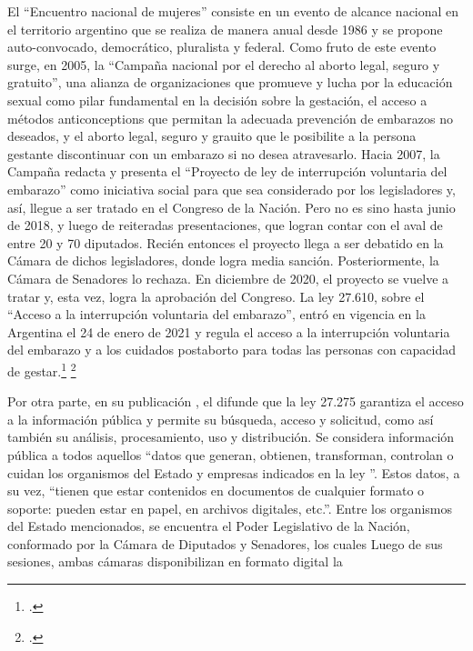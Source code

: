 El ``Encuentro nacional de mujeres'' consiste en un evento de alcance nacional
en el territorio argentino que se realiza de manera anual desde 1986 y se propone
auto-convocado, democr\'atico, pluralista y federal.
Como fruto de este evento surge, en 2005, la ``Campaña nacional por el derecho al
aborto legal, seguro y gratuito'', una alianza de organizaciones que promueve y
lucha por la educaci\'on sexual como pilar fundamental en la decisi\'on sobre la gestaci\'on,
el acceso a m\'etodos anticonceptions que permitan la adecuada prevenci\'on de embarazos
no deseados, y el aborto legal, seguro y grauito que le posibilite a la persona gestante
discontinuar con un embarazo si no desea atravesarlo.
Hacia 2007, la Campaña redacta y presenta el ``Proyecto de ley de interrupci\'on
voluntaria del embarazo'' como iniciativa social para que sea considerado por los
legisladores y, as\'i, llegue a ser tratado en el Congreso de la Naci\'on.
Pero no es sino hasta junio de 2018, y luego de reiteradas presentaciones, que logran
contar con el aval de entre 20 y 70 diputados. Reci\'en entonces el proyecto llega a
ser debatido en la C\'amara de dichos legisladores, donde logra media sanci\'on.
Posteriormente, la C\'amara de Senadores lo rechaza.
En diciembre de 2020, el proyecto se vuelve a tratar y, esta vez, logra la aprobaci\'on
del Congreso.
La ley 27.610, sobre el ``Acceso a la interrupci\'on voluntaria del embarazo'', entr\'o
en vigencia en la Argentina el 24 de enero de 2021 y regula el acceso a la
interrupci\'on voluntaria del embarazo y a los cuidados postaborto para todas
las personas con capacidad de gestar.\footnote{\citeauthor{campana@lalucha}.}
\footnote{\citeauthor{huesped@historia}.}
\par
Por otra parte, en su publicaci\'on ,
el \citeauthor{minjusticia@accesoinfo} difunde que la ley 27.275 garantiza el acceso a la
informaci\'on p\'ublica y permite su b\'usqueda,
acceso y solicitud, como as\'i tambi\'en su an\'alisis, procesamiento, uso y
distribuci\'on.
Se considera informaci\'on p\'ublica a todos aquellos ``datos que generan, obtienen,
transforman, controlan o cuidan los organismos del Estado y empresas indicados en la ley
''. Estos datos, a su vez, ``tienen que estar contenidos en documentos de cualquier
formato o soporte: pueden estar en papel, en archivos digitales, etc.''. Entre los
organismos del Estado mencionados, se encuentra el Poder Legislativo de la
Naci\'on, conformado por la C\'amara de Diputados y Senadores, los cuales
Luego de sus sesiones, ambas c\'amaras disponibilizan en formato digital la
